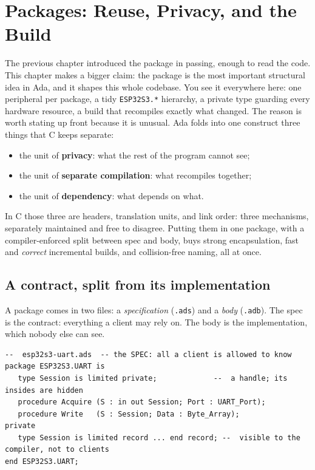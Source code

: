 \chapter{Packages: Reuse, Privacy, and the Build}
\label{ch:packages}

The previous chapter introduced the package in passing, enough to read the code.
This chapter makes a bigger claim: the package is the most important structural idea
in Ada, and it shapes this whole codebase. You see it everywhere here: one peripheral
per package, a tidy \texttt{ESP32S3.*} hierarchy, a private type guarding every
hardware resource, a build that recompiles exactly what changed. The reason is worth
stating up front because it is unusual. Ada folds into one construct three things
that C keeps separate:

\begin{itemize}
\item the unit of \textbf{privacy}: what the rest of the program cannot see;
\item the unit of \textbf{separate compilation}: what recompiles together;
\item the unit of \textbf{dependency}: what depends on what.
\end{itemize}

\noindent
In C those three are headers, translation units, and link order: three mechanisms,
separately maintained and free to disagree. Putting them in one package, with a
compiler-enforced split between spec and body, buys strong encapsulation, fast and
\emph{correct} incremental builds, and collision-free naming, all at once.

\section{A contract, split from its implementation}

A package comes in two files: a \emph{specification} (\texttt{.ads}) and a
\emph{body} (\texttt{.adb}). The spec is the contract: everything a client may rely
on. The body is the implementation, which nobody else can see.

\begin{lstlisting}
--  esp32s3-uart.ads  -- the SPEC: all a client is allowed to know
package ESP32S3.UART is
   type Session is limited private;             --  a handle; its insides are hidden
   procedure Acquire (S : in out Session; Port : UART_Port);
   procedure Write   (S : Session; Data : Byte_Array);
private
   type Session is limited record ... end record; --  visible to the compiler, not to clients
end ESP32S3.UART;
\end{lstlisting}

